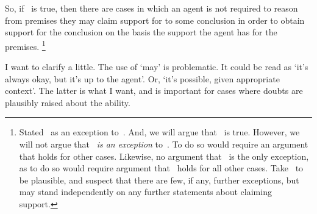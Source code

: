 \begin{note}
  So, if~\EAS{} is true, then there are cases in which an agent is not required to reason from premises they may claim support for to some conclusion in order to obtain support for the conclusion on the basis the support the agent has for the premises.\nolinebreak
  \footnote{
    Stated~\EAS{} as an exception to~\ESU{}.
    And, we will argue that~\EAS{} is true.
    However, we will not argue that~\EAS{} \emph{is an exception} to~\ESU{}.
    To do so would require an argument that \ESU{} holds for other cases.
    Likewise, no argument that~\EAS{} is the only exception, as to do so would require argument that~\ESU{} holds for all other cases.
    Take~\ESU{} to be plausible, and suspect that there are few, if any, further exceptions, but~\EAS{} may stand independently on any further statements about claiming support.
  }
\end{note}

\begin{note}
  \color{red}
  I want to clarify \EAS{} a little.
  The use of `may' is problematic.
  It could be read as `it's always okay, but it's up to the agent'.
  Or, `it's possible, given appropriate context'.
  The latter is what I want, and is important for cases where doubts are plausibly raised about the ability.
\end{note}

